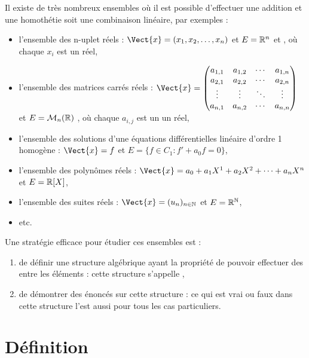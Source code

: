 \documentclass{book}
\begin{document}
\begin{Exemple}[Exemples d'ensembles de vecteurs : \(E=\{\Vect{x}\}\)]
Il existe de très nombreux ensembles  où il est possible d'effectuer une addition et une homothétie soit une combinaison linéaire, par exemples :
\begin{itemize}
\item l'ensemble des n-uplet réels : $\Vect{x}=(x_{1},x_{2},\ldots ,x_{n})$ et $E=\mathbb{R}^n$ et , où chaque $x_{i}$ est un réel,
\item l'ensemble des matrices carrés réels : $\Vect{x}=\begin{pmatrix}
a_{1,1} & a_{1,2} & \cdots & a_{1,n}\\
a_{2,1} & a_{2,2} & \cdots & a_{2,n}\\
\vdots & \vdots & \ddots & \vdots\\
a_{n,1} & a_{n,2} & \cdots & a_{n,n}\\
\end{pmatrix}$ et $E=\mathcal{M}_{n}(\mathbb{R})$ , où  chaque $a_{i,j}$ est un un réel,
\item l'ensemble des solutions d'une équations différentielles linéaire d'ordre 1 homogène : $\Vect{x}=f$  et $E=\{f\in C_1 :  f'+a_{0}f=0\}$,
\item l'ensemble des polynômes réels : $\Vect{x}= a_{0}+a_{1}X^{1}+a_{2}X^{2}+\dots +a_{n}X^{n}$ et $E=\mathbb{R}[X]$,
\item l'ensemble des suites réels : $\Vect{x}=(u_{n})_{n\in \mathbb {N} }$ et $E=\mathbb{R}^{\mathbb{N}}$,
\item etc.
\end{itemize}
\end{Exemple}
Une stratégie efficace pour étudier ces ensembles est :
\begin{enumerate}
\item de définir une structure algébrique ayant la propriété de pouvoir effectuer des  entre les éléments : cette structure s'appelle ,
\item de démontrer des énoncés sur cette structure  : ce qui est vrai ou faux dans cette structure  l'est aussi pour tous les cas particuliers. 
\end{enumerate}

\section{Définition}
\end{document}
